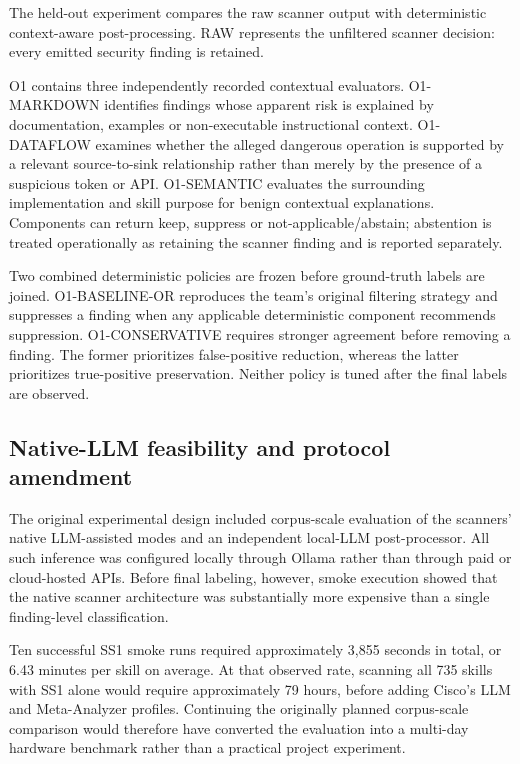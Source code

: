 \documentclass[conference]{IEEEtran}
\begin{document}
The held-out experiment compares the raw scanner output with deterministic context-aware post-processing. RAW represents the unfiltered scanner decision: every emitted security finding is retained.

O1 contains three independently recorded contextual evaluators. O1-MARKDOWN identifies findings whose apparent risk is explained by documentation, examples or non-executable instructional context. O1-DATAFLOW examines whether the alleged dangerous operation is supported by a relevant source-to-sink relationship rather than merely by the presence of a suspicious token or API. O1-SEMANTIC evaluates the surrounding implementation and skill purpose for benign contextual explanations. Components can return keep, suppress or not-applicable/abstain; abstention is treated operationally as retaining the scanner finding and is reported separately.

Two combined deterministic policies are frozen before ground-truth labels are joined. O1-BASELINE-OR reproduces the team's original filtering strategy and suppresses a finding when any applicable deterministic component recommends suppression. O1-CONSERVATIVE requires stronger agreement before removing a finding. The former prioritizes false-positive reduction, whereas the latter prioritizes true-positive preservation. Neither policy is tuned after the final labels are observed.

\subsection{Native-LLM feasibility and protocol amendment}

The original experimental design included corpus-scale evaluation of the scanners' native LLM-assisted modes and an independent local-LLM post-processor. All such inference was configured locally through Ollama rather than through paid or cloud-hosted APIs. Before final labeling, however, smoke execution showed that the native scanner architecture was substantially more expensive than a single finding-level classification.

Ten successful SS1 smoke runs required approximately 3,855 seconds in total, or 6.43 minutes per skill on average. At that observed rate, scanning all 735 skills with SS1 alone would require approximately 79 hours, before adding Cisco's LLM and Meta-Analyzer profiles. Continuing the originally planned corpus-scale comparison would therefore have converted the evaluation into a multi-day hardware benchmark rather than a practical project experiment.
\end{document}
